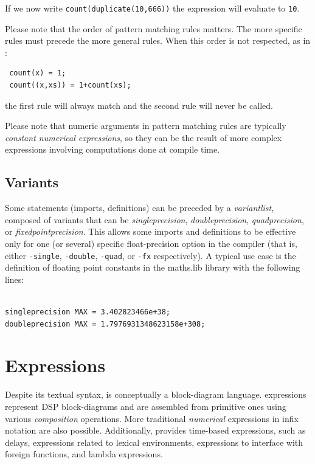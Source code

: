 If we now write \lstinline'count(duplicate(10,666))' the expression will evaluate to \lstinline'10'.

Please note that the order of pattern matching rules matters. The more specific rules must precede the more general rules. When this order is not respected, as in :
\begin{lstlisting}
 count(x) = 1;
 count((x,xs)) = 1+count(xs);
\end{lstlisting}
the first rule will always match and the second rule will never be called.

Please note that numeric arguments in pattern matching rules are typically \textit{constant numerical expressions}, so they can be the result of more complex expressions involving computations done at compile time.

\subsection{Variants}

Some statements (imports, definitions) can be preceded by a \textit{variantlist}, composed of variants that can be \textit{singleprecision}, \textit{doubleprecision}, \textit{quadprecision}, or \textit{fixedpointprecision}. This allows some imports and definitions to be effective only for one (or several) specific float-precision option in the compiler (that is, either \lstinline'-single', \lstinline'-double', \lstinline'-quad', or \lstinline'-fx' respectively). A typical use case is the definition of floating point constants in the maths.lib library with the following lines:

\begin{lstlisting}

singleprecision MAX = 3.402823466e+38;
doubleprecision MAX = 1.7976931348623158e+308;

\end{lstlisting}

\section{Expressions}

Despite its textual syntax, \faust is conceptually a block-diagram language. \faust expressions represent DSP block-diagrams and are assembled from primitive ones using various \textit{composition} operations. More traditional \textit{numerical} expressions in infix notation are also possible. Additionally, \faust provides time-based expressions, such as delays, expressions related to lexical environments, expressions to interface with foreign functions, and lambda expressions.

